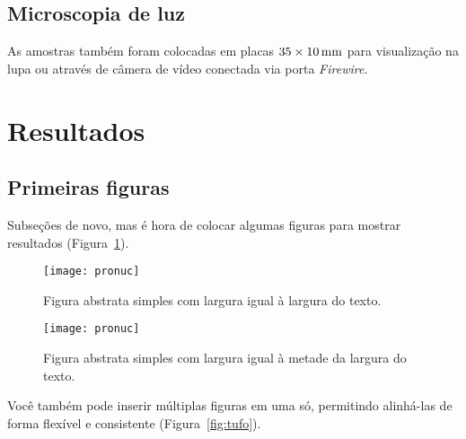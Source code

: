 \subsection{Microscopia de luz}\label{cap2:mem:micro}

As amostras também foram colocadas em placas $35\times\unit[10]{mm}$ para visualização na lupa ou através de câmera de vídeo conectada via porta \emph{Firewire}.

\section{Resultados}\label{cap2:res}

\subsection{Primeiras figuras}\label{cap2:res:figs}

Subseções de novo, mas é hora de colocar algumas figuras para mostrar resultados (Figura~\ref{fig:pronuc}).

\begin{figure}[htbp]
  \centering
  \texttt{[image: pronuc]}
  \caption[Figura simples]{Figura abstrata simples com largura igual à largura do texto.}
  \label{fig:pronuc}
\end{figure}

\begin{figure}[htbp]
  \centering
  \texttt{[image: pronuc]}
  \caption[Outra figura simples]{Figura abstrata simples com largura igual à metade da largura do texto.}
  \label{fig:pronuc2}
\end{figure}

Você também pode inserir múltiplas figuras em uma só, permitindo alinhá-las de forma flexível e consistente (Figura~\ref{fig:tufo}).

